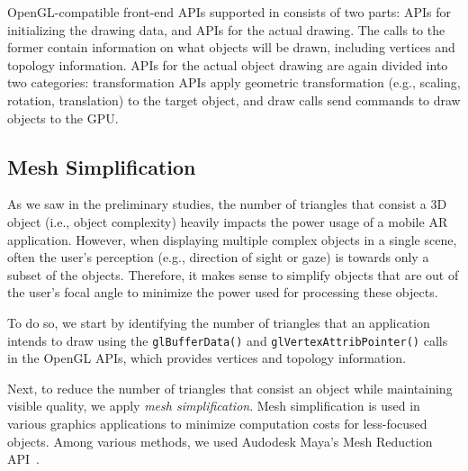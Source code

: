 

OpenGL-compatible front-end APIs supported in {\myit} consists of two parts: 
APIs for initializing the drawing data, and APIs for the actual drawing.
%
The calls to the former contain information on what objects will be drawn,
%
including vertices and topology information. 
%
APIs for the actual object drawing are again divided into two categories:
%
transformation APIs apply geometric transformation
(e.g., scaling, rotation, translation) to the target object, and
%
draw calls send commands to draw objects to the GPU.




\subsection{Mesh Simplification}
\label{sec:mesh}

As we saw in the preliminary studies, the number of triangles that consist 
a 3D object (i.e., object complexity) heavily impacts the power usage of a mobile AR application. 
%
However, when displaying multiple complex objects in a single scene, often the 
user's perception (e.g., direction of sight or gaze) is towards only a subset 
of the objects.
%
Therefore, it makes sense to simplify objects that are out of the user's 
focal angle to minimize the power used for processing these objects.

To do so, we start by identifying the number of triangles that an application 
intends to draw using the {\small\tt glBufferData()}
and {\small\tt glVertexAttribPointer()} calls in the OpenGL APIs,
which provides vertices and topology information. 


Next, to reduce the number of triangles that consist an object while 
maintaining visible quality, we apply \emph{mesh simplification}.
%
Mesh simplification %
is used in various graphics applications to minimize computation costs for less-focused
objects. Among various methods, we used Audodesk Maya's Mesh Reduction
API~\cite{polyReduce}. %


